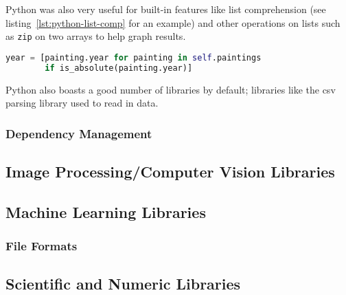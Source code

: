 Python was also very useful for built-in features like list comprehension (see 
listing~\ref{lst:python-list-comp} for an example) and other operations on lists such as 
\texttt{zip} on two arrays to help graph results.

\begin{lstlisting}[language=python,
caption={Example of List Comprehension in Python},
label=lst:python-list-comp]
year = [painting.year for painting in self.paintings 
        if is_absolute(painting.year)]
\end{lstlisting}

Python also boasts a good number of libraries by default; libraries like the \gls{csv} parsing 
library used to read in data.

\subsubsection{Dependency Management}


\subsection{Image Processing/Computer Vision Libraries}


\subsection{Machine Learning Libraries}

\subsubsection{File Formats}


\subsection{Scientific and Numeric Libraries}


